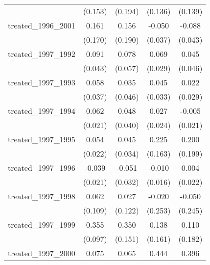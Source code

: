 {\begin{tabular}{l*{4}{c}}
            &     (0.153)         &     (0.194)         &     (0.136)         &     (0.139)         \\
[1em]
treated\_1996\_2001&       0.161         &       0.156         &      -0.050         &      -0.088\sym{*}  \\
            &     (0.170)         &     (0.190)         &     (0.037)         &     (0.043)         \\
[1em]
treated\_1997\_1992&       0.091\sym{*}  &       0.078         &       0.069\sym{*}  &       0.045         \\
            &     (0.043)         &     (0.057)         &     (0.029)         &     (0.046)         \\
[1em]
treated\_1997\_1993&       0.058         &       0.035         &       0.045         &       0.022         \\
            &     (0.037)         &     (0.046)         &     (0.033)         &     (0.029)         \\
[1em]
treated\_1997\_1994&       0.062\sym{**} &       0.048         &       0.027         &      -0.005         \\
            &     (0.021)         &     (0.040)         &     (0.024)         &     (0.021)         \\
[1em]
treated\_1997\_1995&       0.054\sym{*}  &       0.045         &       0.225         &       0.200         \\
            &     (0.022)         &     (0.034)         &     (0.163)         &     (0.199)         \\
[1em]
treated\_1997\_1996&      -0.039         &      -0.051         &      -0.010         &       0.004         \\
            &     (0.021)         &     (0.032)         &     (0.016)         &     (0.022)         \\
[1em]
treated\_1997\_1998&       0.062         &       0.027         &      -0.020         &      -0.050         \\
            &     (0.109)         &     (0.122)         &     (0.253)         &     (0.245)         \\
[1em]
treated\_1997\_1999&       0.355\sym{***}&       0.350\sym{*}  &       0.138         &       0.110         \\
            &     (0.097)         &     (0.151)         &     (0.161)         &     (0.182)         \\
[1em]
treated\_1997\_2000&       0.075         &       0.065         &       0.444         &       0.396         \\

\end{tabular}}
